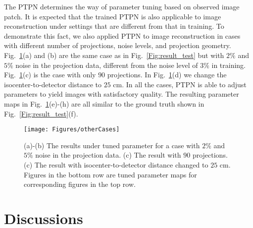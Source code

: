 \documentclass[journal]{IEEEtran}
\begin{document}
The PTPN determines the way of parameter tuning based on observed image patch. It is expected that the trained PTPN is also applicable to image reconstruction under settings that are different from that in training. To demonstrate this fact, we also applied PTPN to image reconstruction in cases with different number of projections, noise levels, and projection geometry. Fig.~\ref{Fig:otherCases}(a) and (b) are the same case as in Fig.~\ref{Fig:result_test} but with $2\%$ and $5\%$ noise in the projection data, different from the noise level of $3\%$ in training. Fig.~\ref{Fig:otherCases}(c) is the case with only $90$ projections. In Fig.~\ref{Fig:otherCases}(d) we change the isocenter-to-detector distance to $25$ cm. In all the cases, PTPN is able to adjust parameters to yield images with satisfactory quality. The resulting parameter maps in Fig.~\ref{Fig:otherCases}(e)-(h) are all similar to the ground truth shown in Fig.~\ref{Fig:result_test}(f). 

\begin{figure}[t]
	\centering
  	\texttt{[image: Figures/otherCases]}
  	\caption{(a)-(b) The results under tuned parameter for a case with $2\%$ and $5\%$ noise in the projection data. (c) The result with $90$ projections. (c) The result with isocenter-to-detector distance changed to $25$ cm. Figures in the bottom row are tuned parameter maps for corresponding figures in the top row.   }
  \label{Fig:otherCases}
\end{figure}


\section{Discussions}
\end{document}
